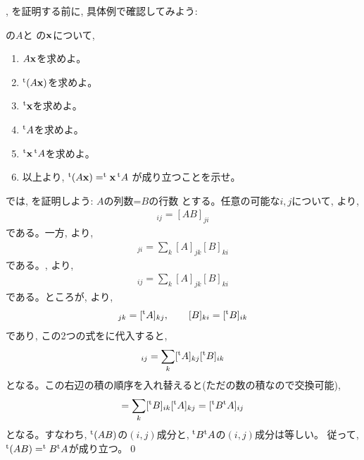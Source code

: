 , を証明する前に, 
具体例で確認してみよう:
\mv

\begin{q}\label{q:tAx_txtA_exmpl} の$A$と
の${\bf x}$について,
\begin{enumerate}
\item $A{\bf x}$を求めよ。
\item $^{\text t}(A{\bf x})$を求めよ。
\item $^{\text t}{\bf x}$を求めよ。
\item $^{\text t}A$を求めよ。
\item $^{\text t}{\bf x}\,^{\text t}A$を求めよ。
\item 以上より, $^{\text t}(A{\bf x})=^{\text t}{\bf x}\,^{\text t}A$
が成り立つことを示せ。
\end{enumerate}
\end{q}
\mv

では, を証明しよう: $A$の列数=$B$の行数
とする。任意の可能な$i, j$について, 
より, 
\begin{eqnarray}
[^{\text t}(AB)]_{ij}=[AB]_{ji}\label{eq:tAB000}
\end{eqnarray}
である。一方, 
より, 
\begin{eqnarray}
[AB]_{ji}=\sum_{k}[A]_{jk}[B]_{ki}\label{eq:tAB001}
\end{eqnarray}
である。, より, 
\begin{eqnarray}
[^{\text t}(AB)]_{ij}=\sum_{k}[A]_{jk}[B]_{ki}\label{eq:tAB002}
\end{eqnarray}
である。ところが, より, 
\begin{eqnarray*}
[A]_{jk}=[^{\text t}A]_{kj},\quad\quad
[B]_{ki}=[^{\text t}B]_{ik}\label{eq:B_transpose_component}
\end{eqnarray*}
であり, この2つの式をに代入すると, 
\begin{eqnarray}
[^{\text t}(AB)]_{ij}=\sum_{k}[^{\text t}A]_{kj}[^{\text t}B]_{ik}\label{eq:tAB004}
\end{eqnarray}
となる。この右辺の積の順序を入れ替えると(ただの数の積なので交換可能), 
\begin{eqnarray}
=\sum_{k} [^{\text t}B]_{ik}[^{\text t}A]_{kj}=[^{\text t}B^{\text t}A]_{ij}\label{eq:tAB006}
\end{eqnarray}
となる。すなわち, $^{\text t}(AB)$の$(i, j)$成分と, $^{\text t}B^{\text t}A$の$(i, j)$成分は等しい。
従って, $^{\text t}(AB)=^{\text t}B^{\text t}A$が成り立つ。\qed
\mv
{}
\mv

